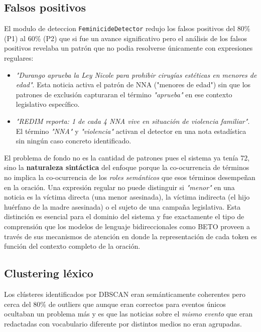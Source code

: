 \subsection{Falsos positivos}
\label{subsec:limit_fp}

El modulo de deteccion \texttt{FeminicideDetector} redujo los falsos positivos del 80\% (P1) al 60\%
(P2) que si fue un avance significativo pero el análisis de los falsos
positivos revelaba un patrón que no podia resolverse únicamente con expresiones regulares:

\begin{itemize}
    \item \textit{"Durango aprueba la Ley Nicole para prohibir cirugías estéticas
          en menores de edad"}. Esta noticia activa el patrón de NNA ("menores
          de edad") sin que los patrones de exclusión capturaran el término
          \textit{"aprueba"} en ese contexto legislativo específico.
    \item \textit{"REDIM reporta: 1 de cada 4 NNA vive en situación de violencia
          familiar"}. El término \textit{"NNA"} y \textit{"violencia"} activan el
          detector en una nota estadística sin ningún caso concreto identificado.
\end{itemize}

El problema de fondo no es la cantidad de patrones pues el sistema ya tenía 72, sino
la \textbf{naturaleza sintáctica} del enfoque porque la co-ocurrencia de términos
no implica la co-ocurrencia de los \textit{roles semánticos} que esos términos
desempeñan en la oración. Una expresión regular no puede distinguir si \textit{"menor"}
en una noticia es la víctima directa (una menor asesinada), la víctima
indirecta (el hijo huérfano de la madre asesinada) o el sujeto de una campaña
legislativa.
Esta distinción es esencial para el dominio del sistema y fue exactamente el tipo de
comprensión que los modelos de lenguaje bidireccionales como BETO proveen a través de
sus mecanismos de atención en donde la representación de cada token es función del contexto
completo de la oración.

\subsection{Clustering léxico}
\label{subsec:limit_clustering}

Los clústeres identificados por DBSCAN eran semánticamente coherentes pero cerca del 80\%
de outliers que aunque eran correctos para eventos únicos ocultaban
un problema más y es que las noticias sobre el \textit{mismo evento}
que eran redactadas con vocabulario diferente por distintos medios no eran agrupadas.

